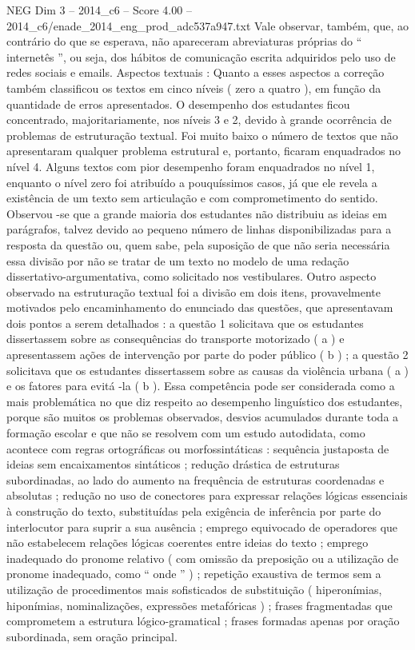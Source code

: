 \begin{textsample}{NEG Dim 3 – 2014\_c6 – Score 4.00 – 2014\_c6/enade\_2014\_eng\_prod\_adc537a947.txt}
Vale observar, também, que, ao contrário do que se esperava, não apareceram abreviaturas próprias do “ internetês ”, ou seja, dos hábitos de comunicação escrita adquiridos pelo uso de redes sociais e emails.
Aspectos textuais : Quanto a esses aspectos a correção também classificou os textos em cinco níveis ( zero a quatro ), em função da quantidade de erros apresentados.
O desempenho dos estudantes ficou concentrado, majoritariamente, nos níveis 3 e 2, devido à grande ocorrência de problemas de estruturação textual.
Foi muito baixo o número de textos que não apresentaram qualquer problema estrutural e, portanto, ficaram enquadrados no nível 4.
Alguns textos com pior desempenho foram enquadrados no nível 1, enquanto o nível zero foi atribuído a pouquíssimos casos, já que ele revela a existência de um texto sem articulação e com comprometimento do sentido.
Observou -se que a grande maioria dos estudantes não distribuiu as ideias em parágrafos, talvez devido ao pequeno número de linhas disponibilizadas para a resposta da questão ou, quem sabe, pela suposição de que não seria necessária essa divisão por não se tratar de um texto no modelo de uma redação dissertativo-argumentativa, como solicitado nos vestibulares.
Outro aspecto observado na estruturação textual foi a divisão em dois itens, provavelmente motivados pelo encaminhamento do enunciado das questões, que apresentavam dois pontos a serem detalhados : a questão 1 solicitava que os estudantes dissertassem sobre as consequências do transporte motorizado ( a ) e apresentassem ações de intervenção por parte do poder público ( b ) ; a questão 2 solicitava que os estudantes dissertassem sobre as causas da violência urbana ( a ) e os fatores para evitá -la ( b ).
Essa competência pode ser considerada como a mais problemática no que diz respeito ao desempenho linguístico dos estudantes, porque são muitos os problemas observados, desvios acumulados durante toda a formação escolar e que não se resolvem com um estudo autodidata, como acontece com regras ortográficas ou morfossintáticas : sequência justaposta de ideias sem encaixamentos sintáticos ; redução drástica de estruturas subordinadas, ao lado do aumento na frequência de estruturas coordenadas e absolutas ; redução no uso de conectores para expressar relações lógicas essenciais à construção do texto, substituídas pela exigência de inferência por parte do interlocutor para suprir a sua ausência ; emprego equivocado de operadores que não estabelecem relações lógicas coerentes entre ideias do texto ; emprego inadequado do pronome relativo ( com omissão da preposição ou a utilização de pronome inadequado, como “ onde ” ) ; repetição exaustiva de termos sem a utilização de procedimentos mais sofisticados de substituição ( hiperonímias, hiponímias, nominalizações, expressões metafóricas ) ; frases fragmentadas que comprometem a estrutura lógico-gramatical ; frases formadas apenas por oração subordinada, sem oração principal.

\end{textsample}

